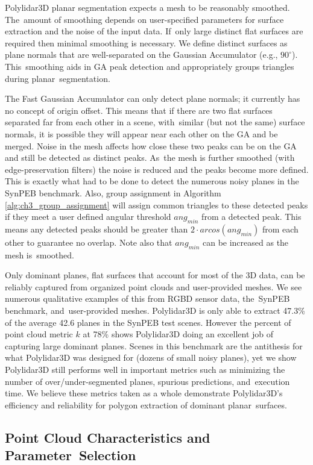 Polylidar3D planar segmentation expects a mesh to be reasonably smoothed. The~amount of smoothing depends on user-specified parameters for surface extraction and the noise of the input data. If~only large distinct flat surfaces are required then minimal smoothing is necessary. We define distinct surfaces as plane normals that are well-separated on the Gaussian Accumulator (e.g., $90^\circ$). This~smoothing aids in GA peak detection and appropriately groups triangles during planar~segmentation. 

The Fast Gaussian Accumulator can only detect plane normals; it currently has no concept of origin offset.  This means that if there are two flat surfaces separated far from each other in a scene, with~similar (but not the same) surface normals, it is possible they will appear near each other on the GA and be merged. Noise in the mesh affects how close these two peaks can be on the GA and still be detected as distinct peaks. As~the mesh is further smoothed (with edge-preservation filters) the noise is reduced and the peaks become more defined. This is exactly what had to be done to detect the numerous noisy planes in the SynPEB benchmark. Also, group assignment in Algorithm \ref{alg:ch3_group_assignment} will assign common triangles to these detected peaks if they meet a user defined angular threshold $ang_{min}$ from a detected peak. This means any detected peaks should be greater than $2\cdot arcos(ang_{min})$ from each other to guarantee no overlap. Note also that $ang_{min}$ can be increased as the mesh is~smoothed.

Only dominant planes, flat surfaces that account for most of the 3D data, can be reliably captured from organized point clouds and user-provided meshes. We see numerous qualitative examples of this from RGBD sensor data, the~SynPEB benchmark, and~user-provided meshes. Polylidar3D is only able to extract 47.3\% of the average 42.6 planes in the SynPEB test scenes. However the percent of point cloud metric $k$ at 78\% shows Polylidar3D doing an excellent job of capturing large dominant planes.  Scenes in this benchmark are the antithesis for what Polylidar3D was designed for (dozens of small noisy planes), yet we show Polylidar3D still performs well in important metrics such as minimizing the number of over/under-segmented planes, spurious predictions, and~execution time. We believe these metrics taken as a whole demonstrate Polylidar3D's efficiency and reliability for polygon extraction of dominant planar~surfaces.

\subsection{Point Cloud Characteristics and Parameter~Selection}

